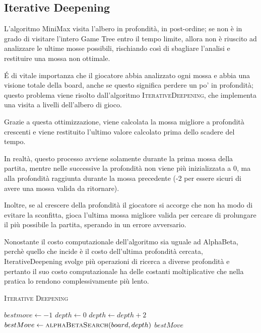 \documentclass{article}
\begin{document}
\pagebreak

\subsection{Iterative Deepening}

L'algoritmo MiniMax visita l'albero in profondità, in post-ordine; se non è in grado di visitare
l'intero Game Tree entro il tempo limite, allora non è riuscito ad analizzare le ultime mosse possibili,
rischiando così di sbagliare l'analisi e restituire una mossa non ottimale.

\'E di vitale importanza che il giocatore abbia analizzato ogni mossa e abbia una visione totale della 
board, anche se questo significa perdere un po' in profondità; questo problema viene risolto
dall'algoritmo \textsc{IterativeDeepening}, che implementa una visita a livelli dell'albero di gioco.

Grazie a questa ottimizzazione, viene calcolata la mossa migliore a profondità crescenti e viene
restituito l'ultimo valore calcolato prima dello scadere del tempo.

In realtà, questo processo avviene solamente durante la prima mossa della partita, mentre nelle successive
la profondità non viene più inizializzata a $0$, ma alla profondità raggiunta durante la mossa
precedente (-2 per essere sicuri di avere una mossa valida da ritornare).

Inoltre, se al crescere della profondità il giocatore si accorge che non ha modo di evitare la sconfitta,
gioca l'ultima mossa migliore valida per cercare di prolungare il più possibile la partita, sperando
in un errore avversario.

Nonostante il costo computazionale dell'algoritmo sia uguale ad AlphaBeta, perchè quello che incide
è il costo dell'ultima profondità cercata, IterativeDeepening svolge più operazioni di ricerca a
diverse profondità e pertanto il suo costo computazionale ha delle costanti moltiplicative che
nella pratica lo rendono complessivamente più lento.

\begin{algorithm}[H]
  \caption{\textsc{Iterative Deepening}}
  \label{alg:itdeepening}
  \begin{algorithmic}
      \State $bestmove \gets -1$
      \State $depth \gets 0$
        \State $depth \gets depth + 2$
        \State $bestMove \gets \Call{alphaBetaSearch}{board,depth}$
      \EndWhile
      \State \Return $bestMove$
    \EndProcedure
  \end{algorithmic}
\end{algorithm}
\end{document}
